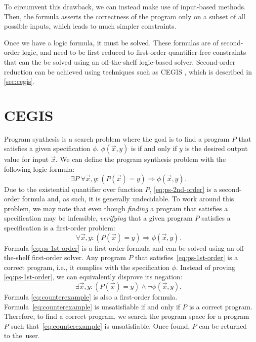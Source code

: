 To circumvent this drawback, we can instead make use of input-based methods. Then, the formula asserts the correctness of the program only on a subset of all possible inputs, which leads to much simpler constraints.

Once we have a logic formula, it must be solved. These formulas are of second-order logic, and need to be first reduced to first-order quantifier-free constraints that can the be solved using an off-the-shelf logic-based solver. Second-order reduction can be achieved using techniques such as \ac{CEGIS} \cite{Solar-LezamaPhDThesis}, which is described in \autoref{sec:cegis}.


\section{\acl{CEGIS}}\label{sec:cegis}

Program synthesis is a search problem where the goal is to find a program \(P\) that satisfies a given specification \(\phi\).
\(\phi(\vec{x}, y)\) is \true{} if and only if \(y\) is the desired output value for input \(\vec{x}\).
We can define the program synthesis problem with the following logic formula:
%
\begin{equation}\label{eq:ps-2nd-order}
\exists P \; \forall \vec{x}, y : (P(\vec{x}) = y) \Rightarrow \phi(\vec{x}, y).
\end{equation}
%
\noindent
Due to the existential quantifier over function \(P\), \eqref{eq:ps-2nd-order} is a second-order formula and, as such, it is generally undecidable. 
To work around this problem, we may note that even though \textit{finding} a program that satisfies a specification may be infeasible, \textit{verifying} that a given program \(P\) satisfies a specification is a first-order problem:
%
\begin{equation}\label{eq:ps-1st-order}
\forall \vec{x}, y : (P(\vec{x}) = y) \Rightarrow \phi(\vec{x}, y).
\end{equation}
%
Formula \eqref{eq:ps-1st-order} is a first-order formula and can be solved using an off-the-shelf first-order solver. Any program \(P\) that satisfies~\eqref{eq:ps-1st-order} is a correct program, i.e., it complies with the specification \(\phi\).
Instead of proving \eqref{eq:ps-1st-order}, we can equivalently disprove its negation:
%
\begin{equation}\label{eq:counterexample}
\exists \vec{x}, y : (P(\vec{x}) = y) \wedge \neg \phi(\vec{x}, y).
\end{equation}
%
Formula \eqref{eq:counterexample} is also a first-order formula.
Formula~\eqref{eq:counterexample} is unsatisfiable if and only if \(P\) is a correct program.
Therefore, to find a correct program, we search the program space for a program \(P\) such that~\eqref{eq:counterexample} is unsatisfiable. Once found, \(P\) can be returned to the~user. %

